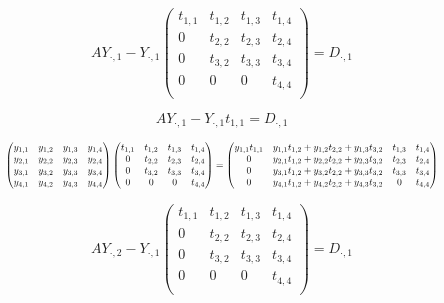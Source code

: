 \documentclass[]{article}
\begin{document}
\begin{equation}
	AY_{\cdot,1}-Y_{\cdot,1}
	\begin{pmatrix}
	t_{1,1} & t_{1,2} & t_{1,3}  & t_{1,4} \\
	0 & t_{2,2} & t_{2,3}  & t_{2,4} \\
	0 & t_{3,2} & t_{3,3}  & t_{3,4} \\
	0 & 0 & 0  & t_{4,4} \\
	\end{pmatrix}
	=
	D_{\cdot,1}
\end{equation}


\begin{equation}
	AY_{\cdot,1}-Y_{\cdot,1}t_{1,1}=D_{\cdot,1}
\end{equation}



\begin{equation}
\resizebox{.9\hsize}{!}{$
	\begin{pmatrix}
	y_{1,1} & y_{1,2} & y_{1,3}  & y_{1,4} \\
	y_{2,1} & y_{2,2} & y_{2,3}  & y_{2,4} \\
	y_{3,1} & y_{3,2} & y_{3,3}  & y_{3,4} \\
	y_{4,1} & y_{4,2} & y_{4,3}  & y_{4,4} \\
	\end{pmatrix}
	\begin{pmatrix}
	t_{1,1} & t_{1,2} & t_{1,3}  & t_{1,4} \\
	0 & t_{2,2} & t_{2,3}  & t_{2,4} \\
	0 & t_{3,2} & t_{3,3}  & t_{3,4} \\
	0 & 0 & 0  & t_{4,4} \\
	\end{pmatrix}
	=
	\begin{pmatrix}
	y_{1,1}t_{1,1} & y_{1,1}t_{1,2}+ y_{1,2}t_{2,2} + y_{1,3}t_{3,2}& t_{1,3}  & t_{1,4} \\
	0 & y_{2,1}t_{1,2}+ y_{2,2}t_{2,2} + y_{2,3}t_{3,2} & t_{2,3}  & t_{2,4} \\
	0 & y_{3,1}t_{1,2}+ y_{3,2}t_{2,2} + y_{3,3}t_{3,2} & t_{3,3}  & t_{3,4} \\
	0 & y_{4,1}t_{1,2}+ y_{4,2}t_{2,2} + y_{4,3}t_{3,2} & 0  & t_{4,4} \\
	\end{pmatrix}
	$}
\end{equation}


\begin{equation}
AY_{\cdot,2}-Y_{\cdot,1}
\begin{pmatrix}
t_{1,1} & t_{1,2} & t_{1,3}  & t_{1,4} \\
0 & t_{2,2} & t_{2,3}  & t_{2,4} \\
0 & t_{3,2} & t_{3,3}  & t_{3,4} \\
0 & 0 & 0  & t_{4,4} \\
\end{pmatrix}
=
D_{\cdot,1}
\end{equation}
\end{document}
